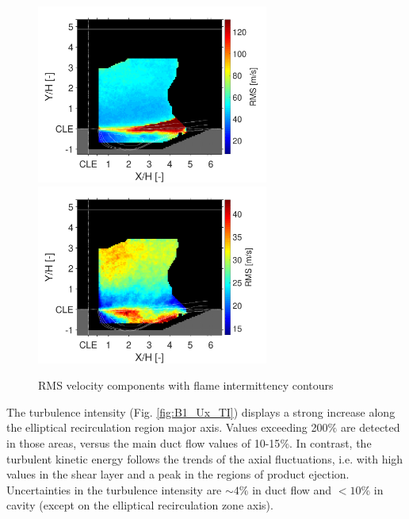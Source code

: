 \begin{figure}
\centering
{}
         {\includegraphics[width=3in,trim=0.35in 0 0.42in 0, clip]{figures/B1/whole_statistics/B1_Ux_RMS}}
        \hspace{0.4in}
                {\includegraphics[width=3in,trim=0.35in 0 0.42in 0, clip]{figures/B1/whole_statistics/B1_Uy_RMS}}
\caption{RMS velocity components with flame intermittency contours}\label{fig:ch3_UxRMS_PIVPLIF}
\end{figure}

The turbulence intensity (Fig. \ref{fig:B1_Ux_TI}) displays a strong increase along the elliptical recirculation region major axis. Values exceeding 200$\%$ are detected in those areas, versus the main duct flow values of 10-15$\%$.  In contrast, the turbulent kinetic energy follows the trends of the axial fluctuations, i.e. with high values in the shear layer and a peak in the regions of product ejection. Uncertainties in the turbulence intensity are $\sim 4\%$ in duct flow and $<10\%$ in cavity (except on the elliptical recirculation zone axis).

